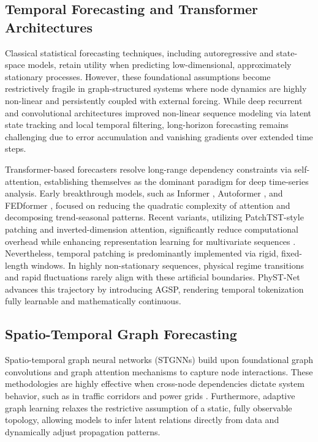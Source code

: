 \subsection{Temporal Forecasting and Transformer Architectures}
\label{sec:related_temporal}
Classical statistical forecasting techniques, including autoregressive and state-space models, retain utility when predicting low-dimensional, approximately stationary processes. However, these foundational assumptions become restrictively fragile in graph-structured systems where node dynamics are highly non-linear and persistently coupled with external forcing. While deep recurrent and convolutional architectures improved non-linear sequence modeling via latent state tracking and local temporal filtering, long-horizon forecasting remains challenging due to error accumulation and vanishing gradients over extended time steps.

Transformer-based forecasters resolve long-range dependency constraints via self-attention, establishing themselves as the dominant paradigm for deep time-series analysis. Early breakthrough models, such as Informer \cite{zhou2021informer}, Autoformer \cite{wu2021autoformer}, and FEDformer \cite{zhou2022fedformer}, focused on reducing the quadratic complexity of attention and decomposing trend-seasonal patterns. Recent variants, utilizing PatchTST-style patching and inverted-dimension attention, significantly reduce computational overhead while enhancing representation learning for multivariate sequences \cite{vaswani2017attention, nie2023patchtst, liu2024itransformer}. Nevertheless, temporal patching is predominantly implemented via rigid, fixed-length windows. In highly non-stationary sequences, physical regime transitions and rapid fluctuations rarely align with these artificial boundaries. PhyST-Net advances this trajectory by introducing AGSP, rendering temporal tokenization fully learnable and mathematically continuous.

\subsection{Spatio-Temporal Graph Forecasting}
\label{sec:related_st_graph}
Spatio-temporal graph neural networks (STGNNs) build upon foundational graph convolutions \cite{kipf2017semi} and graph attention mechanisms \cite{velickovic2018graph} to capture node interactions. These methodologies are highly effective when cross-node dependencies dictate system behavior, such as in traffic corridors and power grids \cite{yu2017spatio, wu2019graph, li2024sdg}. Furthermore, adaptive graph learning relaxes the restrictive assumption of a static, fully observable topology, allowing models to infer latent relations directly from data and dynamically adjust propagation patterns.


